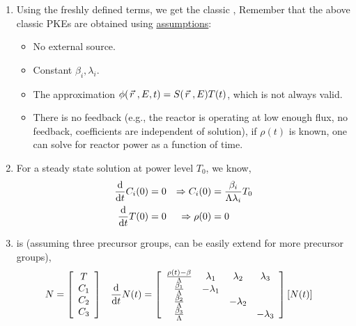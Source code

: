 \documentclass{school-22.211-notes}
\begin{document}
\begin{enumerate}
\item Using the freshly defined terms, we get the classic ,
Remember that the above classic PKEs are obtained using \uline{assumptions}: 
\begin{itemize}
\item No external source.
\item Constant $\beta_i, \lambda_i$. 
\item The approximation $\phi(\left.\vec{r}\right., E, t) = S(\left.\vec{r}\right., E) T(t)$, which is not always valid. 
\item There is no feedback (e.g., the reactor is operating at low enough flux, no feedback, coefficients are independent of solution), if $\rho(t)$ is known, one can solve for reactor power as a function of time.
\end{itemize}

\item For a steady state solution at power level $T_0$, we know, 
  \begin{align}
    \frac{\mathrm{d}}{\mathrm{d}t} C_i (0) &= 0  &\Rightarrow  C_i (0) &= \frac{\beta_i}{\Lambda \lambda_i} T_0  \notag \\
    \frac{\mathrm{d}}{\mathrm{d}t} T(0) &= 0  &\Rightarrow \rho(0) &= 0  \label{in-hour}
  \end{align}

\item {} is (assuming three precursor groups, can be easily extend for more precursor groups),  
\begin{align}
N &= \left[ \begin{array}{c} T \\ C_1 \\ C_2 \\ C_3 \end{array} \right]  
& \frac{\mathrm{d}}{\mathrm{d}t} N(t) &= \left[ \begin{array}{cccc} 
\frac{\rho(t) - \beta}{\Lambda} & \lambda_1 & \lambda_2 & \lambda_3 \\
\frac{\beta_1}{\Lambda} & - \lambda_1 & & \\
\frac{\beta_2}{\Lambda} & & -\lambda_2 & \\
\frac{\beta_3}{\Lambda} & & & -\lambda_3 \end{array} \right] 
\left[ N(t) \right] 
\end{align}

\end{enumerate}
\end{document}
